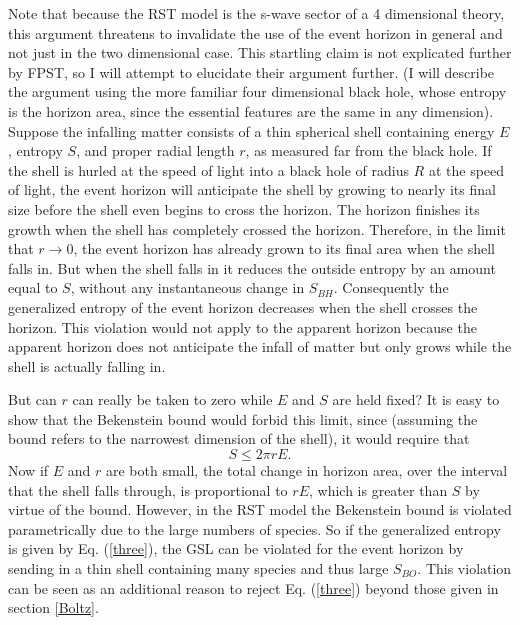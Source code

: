 \documentclass[12pt]{article}
\begin{document}
Note that because the RST model is the s-wave sector of a 4 dimensional theory, this argument threatens to invalidate the use of the event horizon in general and not just in the two dimensional case.  This startling claim is not explicated further by FPST, so I will attempt to elucidate their argument further.  (I will describe the argument using the more familiar four dimensional black hole, whose entropy is the horizon area, since the essential features are the same in any dimension).  Suppose the infalling matter consists of a thin spherical shell containing energy $E$, entropy $S$, and proper radial length $r$, as measured far from the black hole.  If the shell is hurled at the speed of light into a black hole of radius $R$ at the speed of light, the event horizon will anticipate the shell by growing to nearly its final size before the shell even begins to cross the horizon.  The horizon finishes its growth when the shell has completely crossed the horizon.  Therefore, in the limit that $r \to 0$, the event horizon has already grown to its final area when the shell falls in.  But when the shell falls in it reduces the outside entropy by an amount equal to $S$, without any instantaneous change in $S_{BH}$.  Consequently the generalized entropy of the event horizon decreases when the shell crosses the horizon.  This violation would not apply to the apparent horizon because the apparent horizon does not anticipate the infall of matter but only grows while the shell is actually falling in.

But can $r$ can really be taken to zero while $E$ and $S$ are held fixed?  It is easy to show that the Bekenstein bound would forbid this limit, since (assuming the bound refers to the narrowest dimension of the shell), it would require that
\begin{equation}
S \le 2\pi rE.
\end{equation}
Now if $E$ and $r$ are both small, the total change in horizon area, over the interval that the shell falls through, is proportional to $rE$, which is greater than $S$ by virtue of the bound.  However, in the RST model the Bekenstein bound is violated parametrically due to the large numbers of species.  So if the generalized entropy is given by Eq. (\ref{three}), the GSL can be violated for the event horizon by sending in a thin shell containing many species and thus large $S_{BO}$.  This violation can be seen as an additional reason to reject Eq. (\ref{three}) beyond those given in section \ref{Boltz}.
\end{document}
